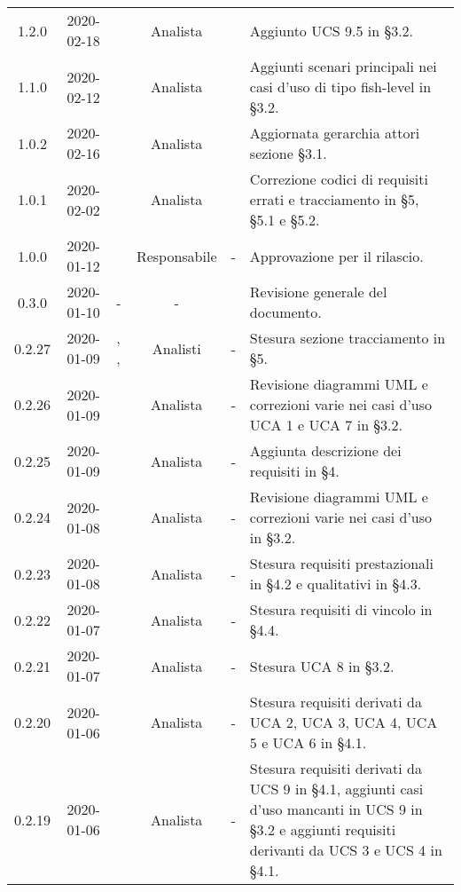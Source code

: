 {\begin{longtable}{ c c  C{2.5cm} c C{3cm} C{3.5cm}}
1.2.0 & 2020-02-18 & \DF{} & Analista & \CE{} & Aggiunto UCS 9.5 in §3.2. \\

1.1.0 & 2020-02-12 & \DF{} & Analista & \CE{} & Aggiunti scenari principali nei casi d'uso di tipo fish-level in §3.2. \\

1.0.2 & 2020-02-16 & \AT{} & Analista & \CE{} & Aggiornata gerarchia attori sezione §3.1. \\

1.0.1 & 2020-02-02 & \AT{} & Analista & \CE{} & Correzione codici di requisiti errati e tracciamento in §5, §5.1 e §5.2. \\

1.0.0 & 2020-01-12 & \AT{} & Responsabile & - & Approvazione per il rilascio. \\

0.3.0 & 2020-01-10 & - & - & \SE{} & Revisione generale del documento. \\

0.2.27 & 2020-01-09 & \CE{}, \PF{}, \DF{} & Analisti & - & Stesura sezione tracciamento in §5. \\

0.2.26 & 2020-01-09 & \PF{} & Analista & - & Revisione diagrammi UML e correzioni varie nei casi d'uso UCA 1 e UCA 7 in §3.2. \\

0.2.25 & 2020-01-09 & \CE{} & Analista & - & Aggiunta descrizione dei requisiti in §4. \\

0.2.24 & 2020-01-08 & \CE{} & Analista & - & Revisione diagrammi UML e correzioni varie nei casi d'uso in §3.2. \\

0.2.23 & 2020-01-08 & \DF{} & Analista & - & Stesura requisiti prestazionali in §4.2 e qualitativi in §4.3. \\

0.2.22 & 2020-01-07 & \PF{} & Analista & - & Stesura requisiti di vincolo in §4.4. \\

0.2.21 & 2020-01-07 & \PF{} & Analista & - & Stesura UCA 8 in §3.2. \\

0.2.20 & 2020-01-06 & \PF{} & Analista & - & Stesura requisiti derivati da UCA 2, UCA 3, UCA 4, UCA 5 e UCA 6 in §4.1. \\

0.2.19 & 2020-01-06 & \DF{} & Analista & - & Stesura requisiti derivati da UCS 9 in §4.1, aggiunti casi d'uso mancanti in UCS 9 in §3.2 e aggiunti requisiti derivanti da UCS 3 e UCS 4 in §4.1. \\


\end{longtable}}
